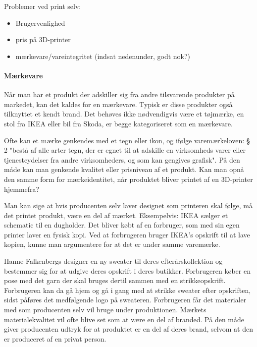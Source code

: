 Problemer ved print selv:

\begin{itemize}
	\item Brugervenlighed
	\item pris på 3D-printer
	\item mærkevare/vareintegritet (indsat nedenunder, godt nok?)
\end{itemize}

\paragraph{Mærkevare}

Når man har et produkt der adskiller sig fra andre tilsvarende produkter på markedet, kan det kaldes for en mærkevare. Typisk er disse produkter også tilknyttet et kendt brand.
Det behøves ikke nødvendigvis være et tøjmærke, en stol fra IKEA eller bil fra Skoda, er begge kategoriseret som en mærkevare. 

Ofte kan et mærke genkendes med et tegn eller ikon, og ifølge varemærkeloven: § 2 "bestå af alle arter tegn, der er egnet til at adskille en virksomheds varer eller tjenesteydelser fra andre virksomheders, og som kan gengives grafisk". På den måde kan man genkende kvalitet eller prisniveau af et produkt. 
Kan man opnå den samme form for mærkeidentitet, når produktet bliver printet af en 3D-printer hjemmefra?

Man kan sige at hvis producenten selv laver designet som printeren skal følge, må det printet produkt, være en del af mærket. Eksempelvis: IKEA sælger et schematic til en dugholder. Det bliver købt af en forbruger, som med sin egen printer laver en fysisk kopi. Ved at forbrugeren bruger IKEA’s opskrift til at lave kopien, kunne man argumentere for at det er under samme varemærke. 

Hanne Falkenbergs\autocite{hanne_falkenberg_hanne_????} designer en ny sweater til deres efterårskollektion og bestemmer sig for at udgive deres opskrift i deres butikker. Forbrugeren køber en pose med det garn der skal bruges dertil sammen med en strikkeopskrift. Forbrugeren kan da gå hjem og gå i gang med at strikke sweater efter opskriften, sidst påføres det medfølgende logo på sweateren. Forbrugeren får det materialer med som producenten selv vil bruge under produktionen. Mærkets materialekvalitet vil ofte blive set som at være en del af branded.  På den måde giver producenten udtryk for at produktet er en del af deres brand, selvom at den er produceret af en privat person. 
																
